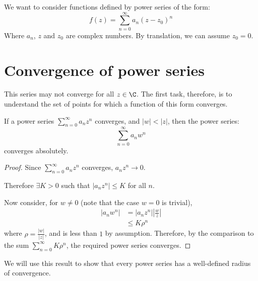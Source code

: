 \documentclass[../Main.tex]{subfiles}
\begin{document}
We want to consider functions defined by power series of the form:
\begin{equation}
    f(z) = \sum_{n=0}^\infty a_n (z - z_0)^n
\end{equation}
Where $a_n$, $z$ and $z_0$ are complex numbers. By translation, we can assume $z_0 = 0$.
\section{Convergence of power series}
This series may not converge for all $z \in \C$. The first task, therefore, is to understand the set of points for which a function of this form converges.
\begin{lemma}
    If a power series $\sum_{n=0}^\infty a_n z^n$ converges, and $|w| < |z|$, then the power series:
    \begin{equation*}
        \sum_{n=0}^\infty a_n w^n
    \end{equation*}
    converges absolutely.
    \label{lemConvergenceRegionIsDisc}
\end{lemma}
\begin{proof}
    Since $\sum_{n=0}^\infty a_n z^n$ converges, $a_n z^n \to 0$.\par
    Therefore $\exists K > 0$ such that $|a_n z^n| \leq K$ for all $n$.\par
    Now consider, for $w \neq 0$ (note that the case $w = 0$ is trivial),
    \begin{align*}
        |a_n w^n| &= |a_n z^n| \left|\frac{w}{z}\right| \\
        &\leq K\rho^n
    \end{align*}
    where $\rho = \frac{|w|}{|z|}$, and is less than $1$ by assumption. Therefore, by the comparison to the sum $\sum_{n=0}^\infty K\rho^n$, the required power series converges.
\end{proof}
\begin{remark}
    We will use this result to show that every power series has a well-defined radius of convergence.
\end{remark}
\end{document}

